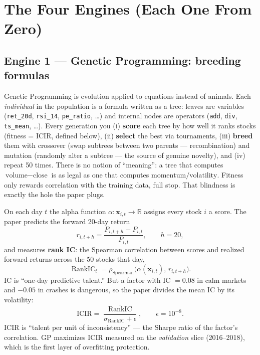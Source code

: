 \documentclass[11pt,a4paper]{article}
\newcommand{\code}[1]{\texttt{#1}}
\begin{document}
\section{The Four Engines (Each One From Zero)}
\label{sec:engines}

\subsection{Engine 1 --- Genetic Programming: breeding formulas}

\begin{plaineng}
Genetic Programming is evolution applied to equations instead of animals. Each
\emph{individual} in the population is a formula written as a tree: leaves are
variables (\code{ret\_20d}, \code{rsi\_14}, \code{pe\_ratio}, \dots) and
internal nodes are operators (\code{add}, \code{div}, \code{ts\_mean}, \dots).
Every generation you (i) \textbf{score} each tree by how well it ranks stocks
(fitness = ICIR, defined below), (ii) \textbf{select} the best via tournaments,
(iii) \textbf{breed} them with crossover (swap subtrees between two parents ---
recombination) and mutation (randomly alter a subtree --- the source of genuine
novelty), and (iv) repeat 50 times. There is no notion of ``meaning'': a tree
that computes $\text{volume} - \text{close}$ is as legal as one that computes
$\text{momentum}/\text{volatility}$. Fitness only rewards correlation with the
training data, full stop. That blindness is exactly the hole the paper plugs.
\end{plaineng}

\begin{themath}
On each day $t$ the alpha function $\alpha:\mathbf{x}_{i,t}\to\mathbb{R}$
assigns every stock $i$ a score. The paper predicts the forward 20-day return
\begin{equation}
  r_{i,t+h} = \frac{P_{i,t+h}-P_{i,t}}{P_{i,t}}, \qquad h = 20,
  \label{eq:target}
\end{equation}
and measures \textbf{rank IC}: the Spearman correlation between scores and
realized forward returns across the 50 stocks that day,
\begin{equation}
  \operatorname{RankIC}_t =
  \rho_{\text{Spearman}}\bigl(\alpha(\mathbf{x}_{i,t}),\, r_{i,t+h}\bigr).
  \label{eq:ic}
\end{equation}
IC is ``one-day predictive talent.'' But a factor with IC $=0.08$ in calm
markets and $-0.05$ in crashes is dangerous, so the paper divides the mean IC
by its volatility:
\begin{equation}
  \mathrm{ICIR} = \frac{\overline{\operatorname{RankIC}}}
  {\sigma_{\operatorname{RankIC}} + \epsilon}, \qquad \epsilon = 10^{-8}.
  \label{eq:icir}
\end{equation}
ICIR is ``talent per unit of inconsistency'' --- the Sharpe ratio of the
factor's correlation. GP maximizes ICIR measured on the \emph{validation}
slice (2016--2018), which is the first layer of overfitting protection.
\end{themath}
\end{document}
